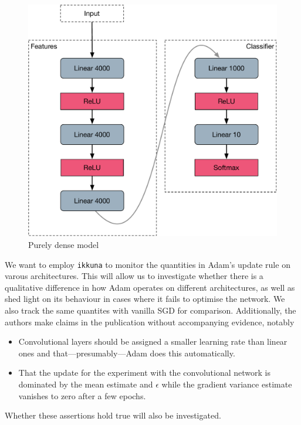 \begin{figure}
    \centering
    \includegraphics[width=.8\linewidth]{gfx/diagrams/neural_network/fullyconnected.pdf}
    \caption{Purely dense model}
    \label{fig:fully-connected}
\end{figure}

We want to employ \texttt{ikkuna} to monitor the quantities in Adam's update
rule on varous architectures. This will allow us to investigate whether there is
a qualitative difference in how Adam operates on different architectures, as
well as shed light on its behaviour in cases where it fails to optimise the
network. We also track the same quantites with vanilla SGD for comparison.
Additionally, the authors make claims in the publication without accompanying
evidence, notably

\begin{itemize}
    \item \label{itm:adam-claim-1} Convolutional layers should be assigned a smaller learning rate than
        linear ones and that---presumably---Adam does this automatically.
    \item
        That the update for the experiment with the convolutional network is
        dominated by the mean estimate and $\epsilon$ while the gradient
        variance estimate vanishes to zero after a few epochs.
\end{itemize}
Whether these assertions hold true will also be investigated.

